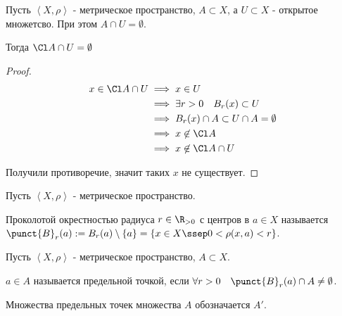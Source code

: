 \begin{consequence} \thmslashn

    Пусть $\left<X, \rho\right>$ - метрическое пространство, $A \subset X$, а $U \subset X$ - открытое множетсво. При этом $A\cap U = \emptyset$.

    Тогда $\Cl A\cap U = \emptyset$
    \begin{proof} \thmslashn
    
        \begin{equation*}
            \begin{split}
                x\in \Cl A\cap U 
                &\implies x\in U\\
                &\implies \exists{r > 0}\quad B_{r}(x) \subset U\\
                &\implies B_{r}(x)\cap A \subset U\cap A = \emptyset\\
                &\implies x \not\in \Cl A\\
                &\implies x \not\in \Cl A\cap U
            \end{split}
        \end{equation*}
        
        Получили противоречие, значит таких $x$ не существует.
    \end{proof}
\end{consequence}
\begin{definition} \thmslashn 

    Пусть $\left<X, \rho\right>$ - метрическое пространство.

    Проколотой окрестностью радиуса $r\in \R_{>0}$ с центров в $a\in X$ называется $\punct{B}_{r}(a) := B_{r}(a) \setminus \{a\} = \{x\in X \ssep 0 < \rho(x, a) < r\}$. 
\end{definition}
\begin{definition} \thmslashn 

    Пусть $\left<X, \rho\right>$ - метрическое пространство, $A \subset X$.

    $a\in A$ называется предельной точкой, если $\forall{r > 0}\quad \punct{B}_{r}(a)\cap A \neq \emptyset$.

    Множества предельных точек множества $A$ обозначается $A'$.
\end{definition}
